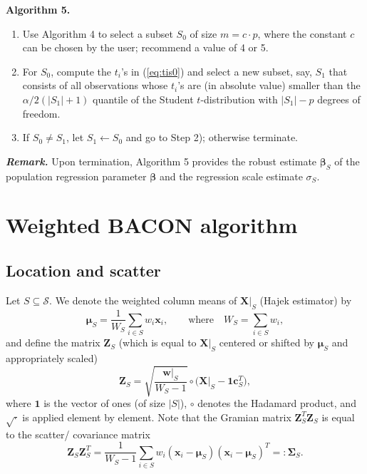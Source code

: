 \documentclass[a4paper,oneside,11pt,DIV=12]{scrartcl}
\begin{document}
\vspace{1em}
\noindent \textbf{\sffamily Algorithm 5.}  
\begin{enumerate}[Step 1)]
	\item Use Algorithm 4 to select a subset $S_0$ of size $m = c\cdot p$, where the constant $c$ can be chosen by the user; \citet{billor_hadi_etal_2000} recommend a value of 4 or 5.
	\item For $S_0$, compute the $t_i$'s in (\ref{eq:tis0}) and select a new subset, say, $S_1$ that consists of all observations whose $t_i$'s are (in absolute value) smaller than the $\alpha/2(\vert S_1 \vert +1)$ quantile of the Student $t$-distribution with $\vert S_1 \vert - p$ degrees of freedom.
	\item If $S_0 \neq S_1$, let $S_1 \gets S_0$ and go to Step 2); otherwise terminate.
\end{enumerate}

\vspace{1em}
\noindent\textbf{\sffamily \small \itshape Remark.} Upon termination, Algorithm 5 provides the robust estimate $\bm \beta_S$ of the population regression parameter $\bm \beta$ and the regression scale estimate $\sigma_S$. 

\section{Weighted BACON algorithm}
\subsection{Location and scatter}
Let $S \subseteq \mathscr{S}$. We denote the weighted column means of $\bm X \vert_S$ (Hajek estimator) by
 \begin{equation}\label{eq:weightedmean}
 	\bm \mu_S = \frac{1}{W_S}\sum_{i \in S} w_i \bm x_i, \qquad \text{where} \quad W_S = \sum_{i \in S} w_i,
 \end{equation}
\noindent and define the matrix $\bm Z_S$ (which is equal to $\bm X\vert_S$ centered or shifted by $\bm \mu_S$ and appropriately scaled)
\begin{equation}\label{eq:x_centered_scaled}
	\bm Z_S = \sqrt{\frac{\bm w\vert_S}{W_S - 1}} \circ \big( \bm X\vert_S - \bm 1 \bm c_S^T \big),
\end{equation}
\noindent where $\bm 1$ is the vector of ones (of size $\vert S \vert$), $\circ$ denotes the Hadamard product, and $\sqrt{\cdot}$ is applied element by element. Note that the Gramian matrix $\bm Z_S^T \bm Z_S$ is equal to the scatter/ covariance matrix 
\begin{equation}\label{eq:weightedsigma}
	\bm Z_S \bm Z_S^T = \frac{1}{W_S - 1}\sum_{i \in S} w_i (\bm x_i - \bm \mu_S)(\bm x_i - \bm \mu_S)^T =:	\bm \Sigma_S.
\end{equation}
\end{document}
